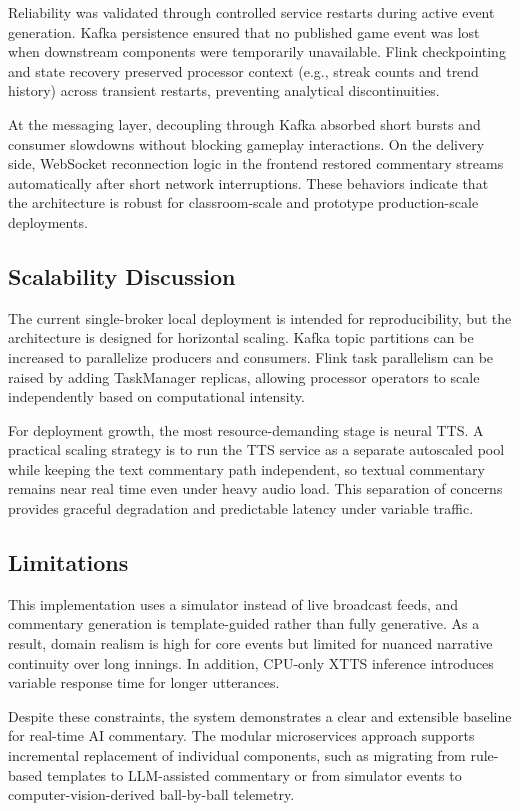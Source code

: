 \documentclass[conference]{IEEEtran}
\begin{document}
Reliability was validated through controlled service restarts during active event generation. Kafka persistence ensured that no published game event was lost when downstream components were temporarily unavailable. Flink checkpointing and state recovery preserved processor context (e.g., streak counts and trend history) across transient restarts, preventing analytical discontinuities.

At the messaging layer, decoupling through Kafka absorbed short bursts and consumer slowdowns without blocking gameplay interactions. On the delivery side, WebSocket reconnection logic in the frontend restored commentary streams automatically after short network interruptions. These behaviors indicate that the architecture is robust for classroom-scale and prototype production-scale deployments.

\subsection{Scalability Discussion}

The current single-broker local deployment is intended for reproducibility, but the architecture is designed for horizontal scaling. Kafka topic partitions can be increased to parallelize producers and consumers. Flink task parallelism can be raised by adding TaskManager replicas, allowing processor operators to scale independently based on computational intensity.

For deployment growth, the most resource-demanding stage is neural TTS. A practical scaling strategy is to run the TTS service as a separate autoscaled pool while keeping the text commentary path independent, so textual commentary remains near real time even under heavy audio load. This separation of concerns provides graceful degradation and predictable latency under variable traffic.

\subsection{Limitations}

This implementation uses a simulator instead of live broadcast feeds, and commentary generation is template-guided rather than fully generative. As a result, domain realism is high for core events but limited for nuanced narrative continuity over long innings. In addition, CPU-only XTTS inference introduces variable response time for longer utterances.

Despite these constraints, the system demonstrates a clear and extensible baseline for real-time AI commentary. The modular microservices approach supports incremental replacement of individual components, such as migrating from rule-based templates to LLM-assisted commentary or from simulator events to computer-vision-derived ball-by-ball telemetry.
\end{document}
